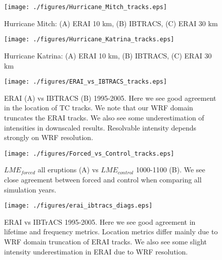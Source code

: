 \documentclass[phd,tocprelim]{cornell}
\begin{document}
\clearpage
\newpage


\begin{figure}[!tbp]
\centering
\texttt{[image: ./figures/Hurricane\_Mitch\_tracks.eps]}
\caption{Hurricane Mitch: (A) ERAI 10 km, (B) IBTRACS, (C) ERAI 30 km}
\label{mitch:tracks}
\end{figure}

\begin{figure}[!tbp]
\centering
\texttt{[image: ./figures/Hurricane\_Katrina\_tracks.eps]}
\caption{Hurricane Katrina: (A) ERAI 10 km, (B) IBTRACS, (C) ERAI 30 km}
\label{katrina:tracks}
\end{figure}

\begin{figure}[!tbp]
\centering
\texttt{[image: ./figures/ERAI\_vs\_IBTRACS\_tracks.eps]}
\caption{ERAI (A) vs IBTRACS (B) 1995-2005. Here we see good agreement in the location of TC tracks. We note that our WRF domain truncates the ERAI tracks. We also see some underestimation of intensities in downscaled results. Resolvable intensity depends strongly on WRF resolution.}
\label{erai:ibtracs:tracks}
\end{figure}

\begin{figure}[!tbp]
\centering
\texttt{[image: ./figures/Forced\_vs\_Control\_tracks.eps]}
\caption{$LME_{forced}$ all eruptions (A) vs $LME_{control}$ 1000-1100 (B). We see close agreement between forced and control when comparing all simulation years.}
\label{forced:ctrl:tracks}
\end{figure}

\begin{figure}[!tbp]
\centering
\texttt{[image: ./figures/erai\_ibtracs\_diags.eps]}
\caption{ERAI vs IBTrACS 1995-2005. Here we see good agreement in lifetime and frequency metrics. Location metrics differ mainly due to WRF domain truncation of ERAI tracks. We also see some slight intensity underestimation in ERAI due to WRF resolution.}
\label{evi:diags}
\end{figure}
\end{document}
